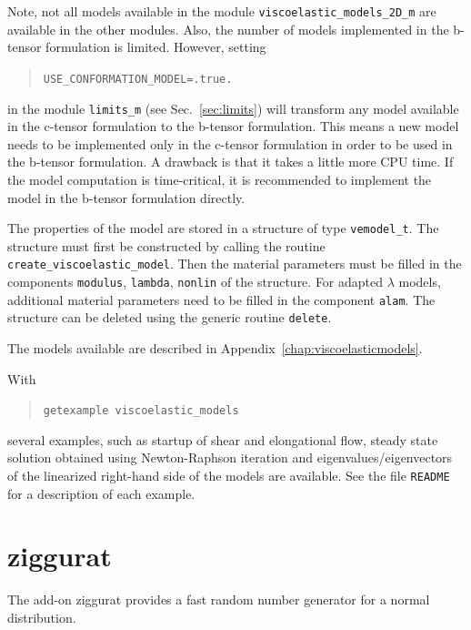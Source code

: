 Note, not all models
available in the module \texttt{viscoelastic\_models\_2D\_m} are available in
the other modules. Also, the number of models implemented in the b-tensor formulation is limited. However, setting
\begin{quote}
   \texttt{USE\_CONFORMATION\_MODEL=.true.}
\end{quote}
in the module \texttt{limits\_m} (see Sec.~\ref{sec:limits}) will transform any model available in the c-tensor formulation to the b-tensor formulation. This means a new model needs to be implemented only in the c-tensor formulation in order to be used in the b-tensor formulation. A drawback is that it takes a little more CPU time. If the model computation is time-critical, it is recommended to implement the model in the b-tensor formulation directly.

The properties of the model are stored in a structure of type
\texttt{vemodel\_t}. The structure must first be constructed by calling the
routine \texttt{create\_viscoelastic\_model}. Then the material parameters must
be filled in the components \texttt{modulus}, \texttt{lambda}, \texttt{nonlin}
of the structure. For adapted $\lambda$ models, additional material parameters need to be filled in the component \texttt{alam}. The structure can be deleted using the generic routine
\texttt{delete}.

The models available are described in Appendix~\ref{chap:viscoelasticmodels}.

With
\begin{quote}
   \texttt{getexample viscoelastic\_models}
\end{quote}
several examples, such as startup of shear and elongational flow, steady state solution obtained using Newton-Raphson iteration and eigenvalues/eigenvectors of the linearized right-hand side of the models are available. See the file \texttt{README} for a description of each example.

\section{ziggurat}
\label{sec:ziggurat}

The add-on ziggurat provides a fast random number generator for a normal
distribution.


